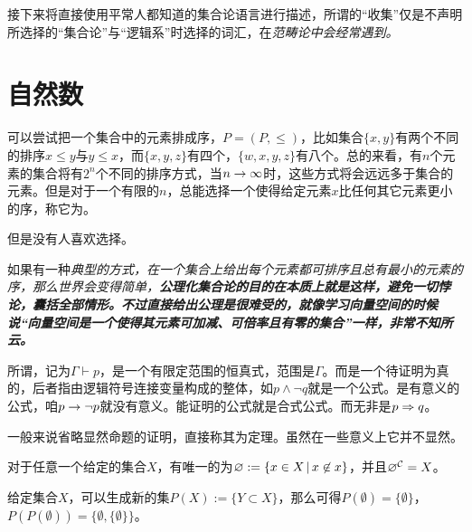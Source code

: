接下来将直接使用平常人都知道的集合论语言进行描述，所谓的“收集”仅是不声明所选择的“集合论”与“逻辑系”时选择的词汇，在\it{范畴论}中会经常遇到。

\section{自然数}

可以尝试把一个集合中的元素排成序，$P = (P,\leqslant)$，比如集合$\{x,y\}$有两个不同的排序$x\leqslant y$与$y\leqslant x$，而$\{x,y,z\}$有四个，$\{w,x,y,z\}$有八个。总的来看，有$n$个元素的集合将有$2^n$个不同的排序方式，当$n\rar\infty$时，这些方式将会远远多于集合的元素。但是对于一个有限的$n$，总能选择一个使得给定元素$x$比任何其它元素更小的序，称它为。

但是没有人喜欢选择。

如果有一种\it{典型}的方式，在一个集合上给出每个元素都可排序且总有最小的元素的序，那么世界会变得简单，\bf{公理化集合论}的目的在本质上就是这样，\it{避免一切悖论，囊括全部情形}。不过直接给出公理是很难受的，就像学习向量空间的时候说“\it{向量空间是一个使得其元素可加减、可倍率且有零的集合}”一样，非常不知所云。

\begin{definition}[定理-命题-推论]
	
	所谓，记为$\Gamma\vdash p$，是一个有限定范围的恒真式，范围是$\Gamma$。而是一个待证明为真的，后者指由逻辑符号连接变量构成的整体，如$p\wedge \neg q$就是一个公式。是有意义的公式，咱$p\rar \neg p$就没有意义。能证明的公式就是合式公式。而无非是$p\Rar q$。
	
\end{definition}

一般来说省略显然命题的证明，直接称其为定理。虽然在一些意义上它并不显然。

\begin{theorem}[空集]
	
	对于任意一个给定的集合$X$，有唯一的为$\emptyset := \{x\in X\setvert x\not\in x\}$，并且$\emptyset^\cal{C} = X$。
	
\end{theorem}

\begin{definition}[幂集]
	
	给定集合$X$，可以生成新的集$P(X) := \{Y\subset X\}$，那么可得$P(\emptyset) = \{\emptyset\}$，$P(P(\emptyset)) = \{\emptyset, \{\emptyset\}\}$。
	
\end{definition}

